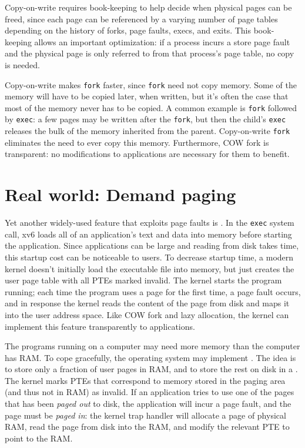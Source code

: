 Copy-on-write requires book-keeping
to help decide when physical pages can be freed, since each page can
be referenced by a varying number of page tables depending on the history of
forks, page faults, execs, and exits. This book-keeping allows
an important optimization: if a process incurs a store page
fault and the physical page is only referred to from that process's
page table, no copy is needed.

Copy-on-write makes \lstinline{fork} faster, since \lstinline{fork}
need not copy memory. Some of the memory will have to be copied
later, when written, but it's often the case that most of the
memory never has to be copied.
A common example is
\lstinline{fork} followed by \lstinline{exec}:
a few pages may be written after the \lstinline{fork},
but then the child's \lstinline{exec} releases
the bulk of the memory inherited from the parent.
Copy-on-write \lstinline{fork} eliminates the need to
ever copy this memory.
Furthermore, COW fork is transparent:
no modifications to applications are necessary for
them to benefit.

\section{Real world: Demand paging}

Yet another widely-used feature that exploits page faults is
.  In the \lstinline{exec} system call, xv6 loads all
of an application's text
and data into memory before starting
the application.  Since applications
can be large and reading from disk takes time, this startup cost can
be noticeable to users. To
decrease startup time, a modern kernel doesn't initially load
the executable file into memory, but just creates the user page table with
all PTEs marked invalid. The kernel starts the program running;
each time the program uses a page for the first time, a page
fault occurs, and in response
the kernel reads the content of the page from disk and
maps it into the user address space.  Like COW fork and lazy
allocation, the kernel can implement this feature transparently to
applications.

The programs running on a computer may need more memory than the
computer has RAM. To cope gracefully, the operating system may
implement . The idea is to store only a
fraction of user pages in RAM, and to store the rest on disk in a
. The kernel marks PTEs that correspond to
memory stored in the paging area (and thus not in RAM) as invalid. If
an application tries to use one of the pages that has been {\it paged
  out} to disk, the application will incur a page fault, and the page
must be {\it paged in}: the kernel trap handler will allocate a page
of physical RAM, read the page from disk into the RAM, and modify the
relevant PTE to point to the RAM.

